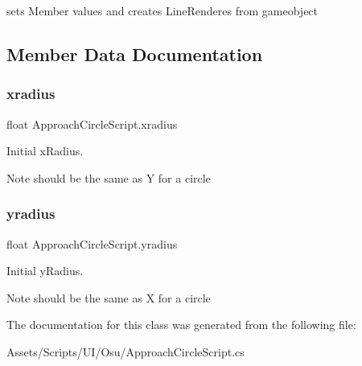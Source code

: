 sets Member values and creates Line\+Renderes from gameobject 

\subsection{Member Data Documentation}
\mbox{\label{class_approach_circle_script_a5fe6dbba38877928ecd860156f44f68e}} 
\subsubsection{\texorpdfstring{xradius}{xradius}}
{\footnotesize\ttfamily float Approach\+Circle\+Script.\+xradius}



Initial x\+Radius. 

\begin{DoxyNote}{Note}
should be the same as Y for a circle 
\end{DoxyNote}
\mbox{\label{class_approach_circle_script_a29314cfa6de27bac0b214a8be7834820}} 
\subsubsection{\texorpdfstring{yradius}{yradius}}
{\footnotesize\ttfamily float Approach\+Circle\+Script.\+yradius}



Initial y\+Radius. 

\begin{DoxyNote}{Note}
should be the same as X for a circle 
\end{DoxyNote}


The documentation for this class was generated from the following file\+:\begin{DoxyCompactItemize}
\item 
Assets/\+Scripts/\+U\+I/\+Osu/Approach\+Circle\+Script.\+cs\end{DoxyCompactItemize}
